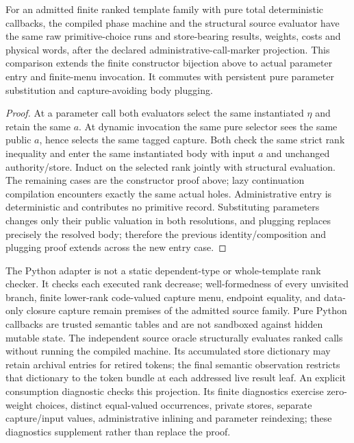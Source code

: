 \documentclass[11pt]{article}
\begin{document}
\begin{proposition}
For an admitted finite ranked template family with pure total deterministic callbacks, the compiled phase machine and the structural source evaluator have the same raw primitive-choice runs and store-bearing results, weights, costs and physical words, after the declared administrative-call-marker projection. This comparison extends the finite constructor bijection above to actual parameter entry and finite-menu invocation. It commutes with persistent pure parameter substitution and capture-avoiding body plugging.
\end{proposition}
\begin{proof}
At a parameter call both evaluators select the same instantiated $\eta$ and retain the same $a$. At dynamic invocation the same pure selector sees the same public $a$, hence selects the same tagged capture. Both check the same strict rank inequality and enter the same instantiated body with input $a$ and unchanged authority/store. Induct on the selected rank jointly with structural evaluation. The remaining cases are the constructor proof above; lazy continuation compilation encounters exactly the same actual holes. Administrative entry is deterministic and contributes no primitive record. Substituting parameters changes only their public valuation in both resolutions, and plugging replaces precisely the resolved body; therefore the previous identity/composition and plugging proof extends across the new entry case.
\end{proof}

The Python adapter is not a static dependent-type or whole-template rank checker. It checks each executed rank decrease; well-formedness of every unvisited branch, finite lower-rank code-valued capture menu, endpoint equality, and data-only closure capture remain premises of the admitted source family. Pure Python callbacks are trusted semantic tables and are not sandboxed against hidden mutable state. The independent source oracle structurally evaluates ranked calls without running the compiled machine. Its accumulated store dictionary may retain archival entries for retired tokens; the final semantic observation restricts that dictionary to the token bundle at each addressed live result leaf. An explicit consumption diagnostic checks this projection. Its finite diagnostics exercise zero-weight choices, distinct equal-valued occurrences, private stores, separate capture/input values, administrative inlining and parameter reindexing; these diagnostics supplement rather than replace the proof.
\end{document}
